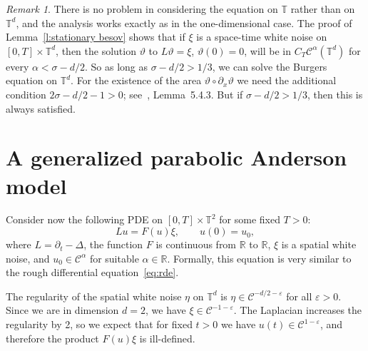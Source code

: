 \documentclass[11pt,a4paper]{article}
\theoremstyle{remark}
\newtheorem{remark}[theorem]{Remark}
\newcommand{\R}{\mathbb{R}}
\newcommand{\CC}{\ensuremath{\mathscr{C}}}
\begin{document}
\begin{remark}
   There is no problem in considering the equation on $\mathbb{T}$ rather than on $\mathbb{T}^d$, %
   and the analysis works exactly as in the one-dimensional case. The proof of Lemma~\ref{l:stationary besov} shows that if $\xi$ is a space-time white noise on $[0,T] \times \mathbb{T}^d$, then the solution $\vartheta$ to $L \vartheta = \xi$, $\vartheta(0) = 0$, will be in $C_T\CC^\alpha(\mathbb{T}^d)$ for every $\alpha < \sigma - d/2$. So as long as $\sigma - d/2 > 1/3$, we can solve the Burgers equation on $\mathbb{T}^d$. For the existence of the area $\vartheta \circ \partial_x \vartheta$ we need the additional condition $2 \sigma - d/2 - 1 > 0$; see~\cite{Perkowski2014Thesis}, Lemma~5.4.3. But if $\sigma - d/2 > 1/3$, then this is always satisfied. 
\end{remark}



\section{A generalized parabolic Anderson model}\label{sec:PAM}

Consider now the following PDE on $[ 0,T ] \times \mathbb{T}^{2}$ for some fixed $T>0$:
\begin{equation}\label{eq:pam}
  L u=F ( u ) \xi, \qquad u(0) = u_0,
\end{equation}
where $L = \partial_{t} - \Delta$, the function $F$ is continuous from
$\mathbb{R}$ to $\mathbb{R}$, $\xi$ is a spatial white noise, and $u_0 \in \CC^\alpha$ for suitable $\alpha \in \R$.
Formally, this equation is very similar to the rough differential
equation~{\eqref{eq:rde}}.

The regularity of the spatial white noise $\eta$ on $\mathbb{T}^{d}$ is $\eta \in \CC^{-d/2- \varepsilon}$ for all $\varepsilon >0$. Since we are
in dimension $d=2$, we have $\xi \in \CC^{-1- \varepsilon}$. The
Laplacian increases the regularity by 2, so we expect that for fixed $t>0$ we
have $u ( t ) \in \CC^{1- \varepsilon}$, and therefore the product
$F ( u ) \xi$ is ill-defined.
\end{document}
